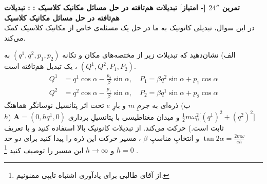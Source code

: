 \documentclass{article}
\newenvironment{parind}{%
	\par%
	\leftskip=0mm\rightskip=7mm
	\noindent\ignorespaces}{%
	\par}
\newenvironment{exercise}[3][\unskip]{%
	\par
	\noindent
	\textbf{تمرین
		#1
		[- امتیاز] 
		\def\temp{#3}\ifx\temp\empty
		: 
		\else
		: #3 \vspace{0.5em} \\ \noindent
		\fi
}}{}
\begin{document}
	\begin{exercise}[$24''$]{20}{تبدیلات هم‌تافته در حل مسائل مکانیک کلاسیک}
		در این سوال، تبدیلی کانونیک به ما در حل یک مسئله‌ی خاص از مکانیک کلاسیک کمک می‌کند.
		\begin{parind}
			الف)
			نشان‌دهید که تبدیلات زیر از مختصه‌های مکان و تکانه
			$(q^1,q^2,p_1,p_2)$
			به 
			$(Q^1,Q^2,P_1,P_2)$
			، یک تبدیل هم‌تافته است.
			\begin{equation*}
				\begin{aligned}
					Q^1 &= q^1\cos\alpha - \frac{p_2}{\beta}\sin\alpha, \quad P_1 = \beta q^2 \sin\alpha + p_1\cos\alpha
					\\
					Q^2 &= q^2\cos\alpha - \frac{p_1}{\beta}\sin\alpha, \quad P_2 = \beta q^1 \sin\alpha + p_2\cos\alpha
				\end{aligned}
			\end{equation*}
			ب) ذره‌ای به جرمِ $m$ و بارِ $e$
			تحت اثر پتانسیل نوسانگر هماهنگ 
			$\frac12 m\omega_0^2 \big[
			(q^1)^2+ (q^2)^2
			\big]$
			و میدان مغناطیسی با پتانسیلِ برداری 
			$\mathbf{A} = (0,hq^1,0)$
			($h$ ثابت است.)
			حرکت می‌کند.
			از تبدیلات کانونیک بالا استفاده کنید و با تعریف 
			$\tan 2\alpha = \frac{2m\omega}{eh}$ و انتخابِ مناسبِ $\beta$
			، مسیر حرکت این ذره را پیدا کنید برای دو حد 
			$h=0$ و $h \to \infty$
			این مسیر را توصیف کنید
			\footnote{از آقای طالبی برای یادآوری اشتباه تایپی ممنونیم.}
			.
		\end{parind}
	\end{exercise}
	
\end{document}
